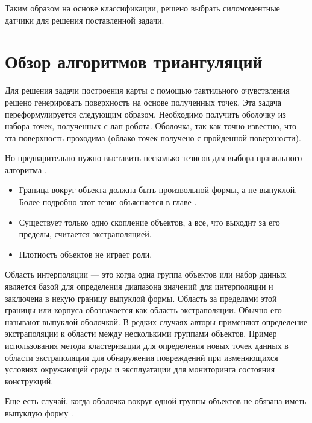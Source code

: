 Таким образом на основе классификации, решено выбрать силомоментные датчики для решения поставленной задачи.

\section{Обзор алгоритмов триангуляций}
Для решения задачи построения карты с помощью тактильного очувствления решено генерировать поверхность на основе полученных точек. Эта задача переформулируется следующим образом. Необходимо получить оболочку из набора точек, полученных с лап робота. Оболочка, так как точно известно, что эта поверхность проходима (облако точек получено с пройденной поверхности). 

Но предварительно нужно выставить несколько тезисов для выбора правильного алгоритма \cite{ebertInterpolationExtrapolationComparison2014,kumarSurfaceTriangulationSurvey,aurenhammerVoronoiDiagramsSurvey1991}.
\begin{itemize}
    \item Граница вокруг объекта должна быть произвольной формы, а не выпуклой. Более подробно этот тезис объясняется в главе .
    \item Существует только одно скопление объектов, а все, что выходит за его пределы, считается экстраполяцией. 
    \item Плотность объектов не играет роли.
\end{itemize}

Область интерполяции \cite{brooksCharacterizingDomainRegression1988,patelLinearProgramDetect1995,baranyiEffectsParameterizationPerformance1996,haffnerEscapingConvexHull2001,kingDangersExtremeCounterfactuals2006} --- это когда одна группа объектов или набор данных является базой для определения диапазона значений для интерполяции и заключена в некую границу выпуклой формы. Область за пределами этой границы или корпуса обозначается как область экстраполяции. Обычно его называют выпуклой оболочкой. В редких случаях авторы применяют определение экстраполяции к области между несколькими группами объектов. Пример использования метода кластеризации для определения новых точек данных в области экстраполяции для обнаружения повреждений при изменяющихся условиях окружающей среды и эксплуатации для мониторинга состояния конструкций.

Еще есть случай, когда оболочка вокруг одной группы объектов не обязана иметь выпуклую форму \cite{rejerHypertubePossibleInterpolation2006,j.a.leonardUsingRadialBasis1992,verleysenLearningHighdimensionalData2001}.

